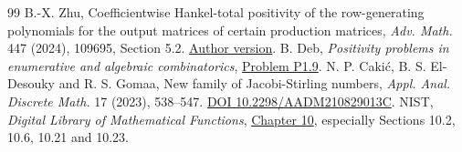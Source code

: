\documentclass[11pt]{article}
\theoremstyle{plain}\newtheorem{theorem}{Theorem}[section]\newtheorem{lemma}[theorem]{Lemma}\newtheorem{corollary}[theorem]{Corollary}\newtheorem{proposition}[theorem]{Proposition}
\numberwithin{equation}{section}
\begin{document}
\begin{thebibliography}{99}
 B.-X. Zhu, Coefficientwise Hankel-total positivity of the row-generating polynomials for the output matrices of certain production matrices, \emph{Adv. Math.} 447 (2024), 109695, Section 5.2. \href{https://arxiv.org/html/2202.03793v2}{Author version}.
 B. Deb, \emph{Positivity problems in enumerative and algebraic combinatorics}, \href{https://bishaldeb.com/positivity/themes/SMSCHTP/hankel.html}{Problem P1.9}.
 N. P. Caki\'c, B. S. El-Desouky and R. S. Gomaa, New family of Jacobi-Stirling numbers, \emph{Appl. Anal. Discrete Math.} 17 (2023), 538--547. \href{https://doi.org/10.2298/AADM210829013C}{DOI 10.2298/AADM210829013C}.
 NIST, \emph{Digital Library of Mathematical Functions}, \href{https://dlmf.nist.gov/10}{Chapter 10}, especially Sections 10.2, 10.6, 10.21 and 10.23.
\end{thebibliography}
\end{document}
